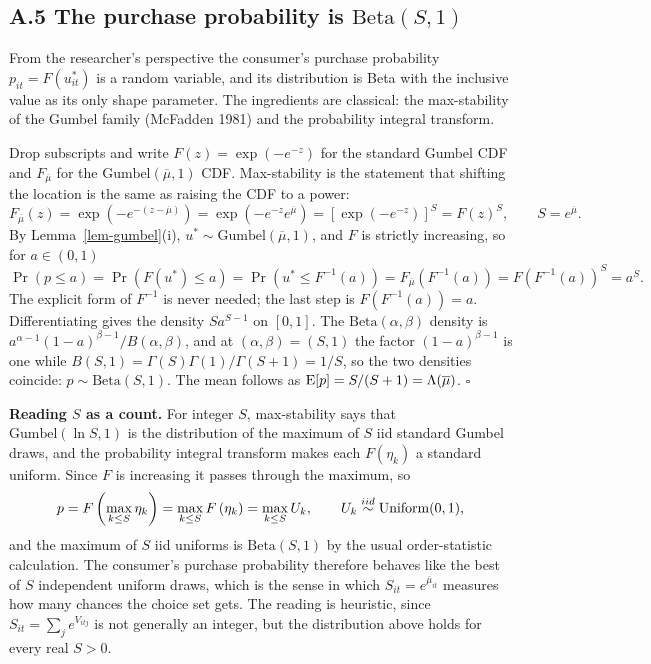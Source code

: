 \documentclass[
  letterpaper,
  DIV=11,
  numbers=noendperiod]{scrartcl}
\theoremstyle{plain}
\theoremstyle{plain}
\theoremstyle{plain}
\theoremstyle{remark}
\begin{document}
\subsection*{\texorpdfstring{A.5 The purchase probability is
\(\text{Beta}(S,1)\)}{A.5 The purchase probability is \textbackslash text\{Beta\}(S,1)}}\label{sec-appendix-beta}

From the researcher's perspective the consumer's purchase probability
\(p_{it} = F \left( u^*_{it} \right)\) is a random variable, and its
distribution is Beta with the inclusive value as its only shape
parameter. The ingredients are classical: the max-stability of the
Gumbel family (McFadden 1981) and the probability integral transform.

Drop subscripts and write \(F(z) = \exp \left( -e^{-z} \right)\) for the
standard Gumbel CDF and \(F_{\overline{\mu}}\) for the
\(\text{Gumbel}(\overline{\mu},1)\) CDF. Max-stability is the statement
that shifting the location is the same as raising the CDF to a power: \[
F_{\overline{\mu}}(z)
= \exp \left( -e^{-(z - \overline{\mu})} \right)
= \exp \left( -e^{-z} e^{\overline{\mu}} \right)
= \left[ \exp \left( -e^{-z} \right) \right]^{S}
= F(z)^{S},
\qquad S = e^{\overline{\mu}}.
\] By Lemma~\ref{lem-gumbel}(i),
\(u^* \sim \text{Gumbel}(\overline{\mu},1)\), and \(F\) is strictly
increasing, so for \(a \in (0,1)\) \[
\Pr \left( p \le a \right)
= \Pr \left( F(u^*) \le a \right)
= \Pr \left( u^* \le F^{-1}(a) \right)
= F_{\overline{\mu}} \left( F^{-1}(a) \right)
= F \left( F^{-1}(a) \right)^{S}
= a^{S}.
\] The explicit form of \(F^{-1}\) is never needed; the last step is
\(F(F^{-1}(a)) = a\). Differentiating gives the density \(S a^{S-1}\) on
\([0,1]\). The \(\text{Beta}(\alpha, \beta)\) density is
\(a^{\alpha-1} (1-a)^{\beta-1} / B(\alpha,\beta)\), and at
\((\alpha,\beta) = (S,1)\) the factor \((1-a)^{\beta-1}\) is one while
\(B(S,1) = \Gamma(S)\Gamma(1) / \Gamma(S+1) = 1/S\), so the two
densities coincide: \(p \sim \text{Beta}(S,1)\). The mean follows as
\(\operatorname{E}[p] = S / (S+1) = \Lambda(\overline{\mu})\). \(\square\)

\textbf{Reading \(S\) as a count.} For integer \(S\), max-stability says
that \(\text{Gumbel}(\ln S, 1)\) is the distribution of the maximum of
\(S\) iid standard Gumbel draws, and the probability integral transform
makes each \(F(\eta_k)\) a standard uniform. Since \(F\) is increasing
it passes through the maximum, so \[
p = F \left( \max_{k \le S} \eta_k \right) = \max_{k \le S} F \left( \eta_k \right) = \max_{k \le S} U_k,
\qquad U_k \stackrel{iid}{\sim} \text{Uniform}(0,1),
\] and the maximum of \(S\) iid uniforms is \(\text{Beta}(S,1)\) by the
usual order-statistic calculation. The consumer's purchase probability
therefore behaves like the best of \(S\) independent uniform draws,
which is the sense in which \(S_{it} = e^{\overline{\mu}_{it}}\)
measures how many chances the choice set gets. The reading is heuristic,
since \(S_{it} = \sum_j e^{V_{itj}}\) is not generally an integer, but
the distribution above holds for every real \(S > 0\).
\end{document}
